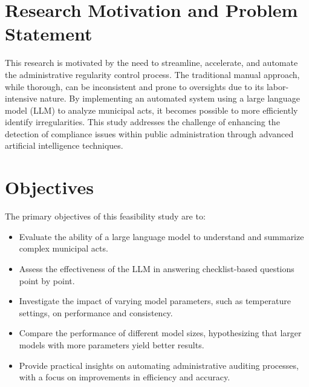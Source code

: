 \documentclass[../main.tex]{subfiles}
\begin{document}
\section*{Research Motivation and Problem Statement}
This research is motivated by the need to streamline, accelerate, and automate the administrative regularity control process. The traditional manual approach, while thorough, can be inconsistent and prone to oversights due to its labor-intensive nature. By implementing an automated system using a large language model (LLM) to analyze municipal acts, it becomes possible to more efficiently identify irregularities. This study addresses the challenge of enhancing the detection of compliance issues within public administration through advanced artificial intelligence techniques.

\section*{Objectives}
The primary objectives of this feasibility study are to:
\begin{itemize}
    \item Evaluate the ability of a large language model to understand and summarize complex municipal acts.
    \item Assess the effectiveness of the LLM in answering checklist-based questions point by point.
    \item Investigate the impact of varying model parameters, such as temperature settings, on performance and consistency.
    \item Compare the performance of different model sizes, hypothesizing that larger models with more parameters yield better results.
    \item Provide practical insights on automating administrative auditing processes, with a focus on improvements in efficiency and accuracy.
\end{itemize}
\end{document}
